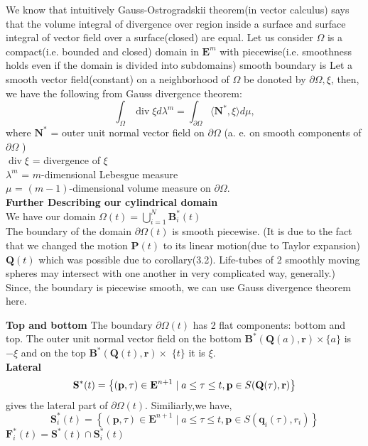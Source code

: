 We know that intuitively Gauss-Ostrogradskii theorem(in vector calculus) says that the volume integral of divergence over region inside a surface and surface integral of vector field over a surface(closed) are equal. Let us consider $\Omega$ is a compact(i.e. bounded and closed) domain in $\mathbf{E}^{m}$ with piecewise(i.e. smoothness holds even if the domain is divided into subdomains) smooth boundary  is Let a smooth vector field(constant) on a neighborhood of $\Omega$ be donoted by $\partial \Omega, \xi$, then, we have the following from Gauss divergence theorem:
$$
\int_{\Omega} \operatorname{div} \xi d \lambda^{m}=\int_{\partial \Omega}\langle\mathbf{N}^*, \xi\rangle d \mu,
$$
where $\mathbf{N}^*$ = outer unit normal vector field on $\partial \Omega$ (a. e.  on smooth components of $\partial \Omega$ )\\
$\operatorname{div} \xi$ = divergence of $\xi$\\
$\lambda^{m}$ = $m$-dimensional Lebesgue measure\\
$\mu$ = $(m-1)$-dimensional volume measure on $\partial \Omega$. \\


\textbf{Further Describing our cylindrical domain}\\

We have our domain $\Omega(t)=\bigcup_{i=1}^{N} \mathbf{B}^*_{i}(t)$\\
The boundary of the domain $\partial \Omega(t)$  is  smooth  piecewise. (It is due to the fact that we changed  the motion $\mathbf{P}(t)$ to its linear motion(due to Taylor expansion) $\mathbf{Q}(t)$ which was possible due to corollary(3.2).  Life-tubes of 2 smoothly moving spheres may intersect with one another in very complicated way, generally.) Since, the boundary is piecewise smooth, we can use Gauss divergence theorem here. 

\textbf{Top and bottom}
The boundary $\partial \Omega(t)$ has 2 flat components:  bottom  and  top.  The outer unit normal vector field on the bottom $\mathbf{B}^*(\mathbf{Q}(a), \mathbf{r}) \times\{a\}$ is $-\xi$ and on the top $\mathbf{B}^*(\mathbf{Q}(t), \mathbf{r}) \times$ $\{t\}$ it is $\xi$.\\
\textbf{Lateral}
$$
\large\mathbf{S}^*(t)=\left\{(\mathbf{p}, \tau) \in \mathbf{E}^{n+1} \mid a \leq \tau \leq t, \mathbf{p} \in S(\mathbf{Q}(\tau), \mathbf{r})\right\}
$$
gives the lateral part of $\partial\Omega(t)$. Similiarly,we have,
$$
\mathbf{S}_{i}^*(t)=\left\{(\mathbf{p}, \tau) \in \mathbf{E}^{n+1} \mid a \leq \tau \leq t, \mathbf{p} \in S\left(\mathbf{q}_{i}(\tau), r_{i}\right)\right\}
$$
$\mathbf{F}_{i}^*(t)=\mathbf{S}^*(t) \cap \mathbf{S}_{i}^*(t)$

